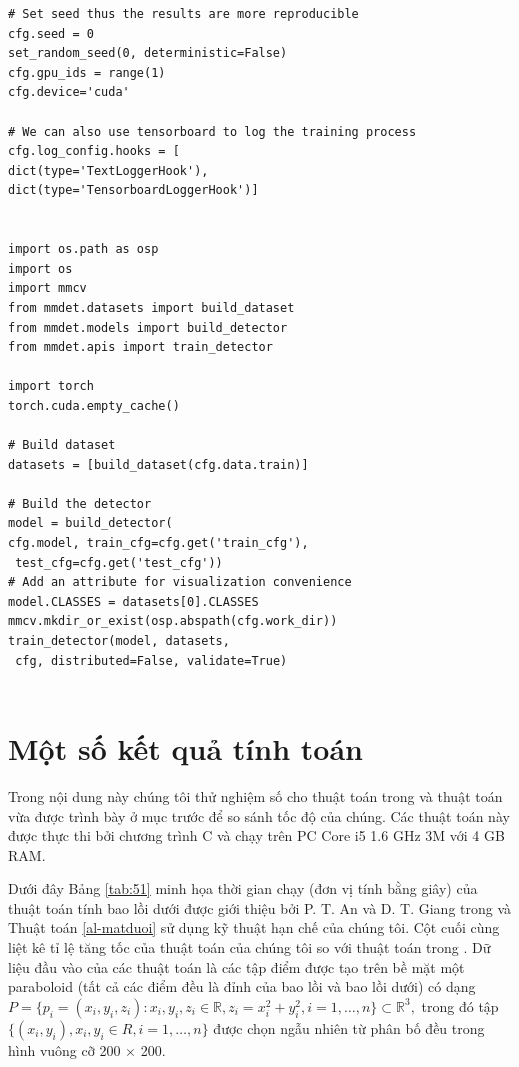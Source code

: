 \documentclass[12pt,a4paper,openany,oneside]{report}
\begin{document}
\begin{lstlisting}
# Set seed thus the results are more reproducible
cfg.seed = 0
set_random_seed(0, deterministic=False)
cfg.gpu_ids = range(1)
cfg.device='cuda'

# We can also use tensorboard to log the training process
cfg.log_config.hooks = [
dict(type='TextLoggerHook'),
dict(type='TensorboardLoggerHook')]


import os.path as osp
import os
import mmcv
from mmdet.datasets import build_dataset
from mmdet.models import build_detector
from mmdet.apis import train_detector

import torch
torch.cuda.empty_cache()

# Build dataset
datasets = [build_dataset(cfg.data.train)]

# Build the detector
model = build_detector(
cfg.model, train_cfg=cfg.get('train_cfg'),
 test_cfg=cfg.get('test_cfg'))
# Add an attribute for visualization convenience
model.CLASSES = datasets[0].CLASSES
mmcv.mkdir_or_exist(osp.abspath(cfg.work_dir))
train_detector(model, datasets,
 cfg, distributed=False, validate=True)


\end{lstlisting}

\chapter{Một số kết quả tính toán }
Trong nội dung này chúng tôi thử nghiệm số cho thuật toán trong \cite{An-Giang} và thuật toán vừa được trình bày ở mục trước để so sánh tốc độ của chúng. Các thuật toán này được thực thi bởi chương trình C và chạy trên PC Core i5 1.6 GHz 3M với 4 GB RAM.  

Dưới đây Bảng \ref{tab:51} minh họa thời gian chạy (đơn vị tính bằng giây) của thuật toán tính bao lồi dưới được giới thiệu bởi P. T. An và D. T. Giang trong \cite{An-Giang} và Thuật toán \ref{al-matduoi} sử dụng kỹ thuật hạn chế của chúng tôi. Cột cuối cùng liệt kê tỉ lệ tăng tốc của thuật toán của chúng tôi so với thuật toán trong \cite{An-Giang}. Dữ liệu đầu vào của các thuật toán là các tập điểm được tạo trên bề mặt một paraboloid (tất cả các điểm đều là đỉnh của bao lồi và bao lồi dưới) có dạng $P = \{p_i = (x_i, y_i, z_i): x_i, y_i, z_i \in \mathbb{R}, z_i = x_i^2 + y_i^2, i = 1, \ldots, n\} \subset \mathbb{R}^3,$ trong đó tập $\{(x_i, y_i), x_i, y_i \in R, i = 1, \ldots , n \}$ được chọn ngẫu nhiên từ phân bố đều trong hình vuông cỡ 200 $\times$ 200. 
\end{document}
